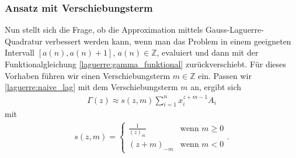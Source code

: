 \subsubsection{Ansatz mit Verschiebungsterm}
Nun stellt sich die Frage,
ob die Approximation mittels Gauss-Laguerre-Quadratur verbessert werden kann,
wenn man das Problem in einem geeigneten Intervall $[a(n), a(n)+1]$,
$a(n) \in \mathbb{Z}$,
evaluiert und dann mit der
Funktionalgleichung \eqref{laguerre:gamma_funktional} zurückverschiebt.
Für dieses Vorhaben führen wir einen Verschiebungsterm $m \in \mathbb{Z}$ ein.
Passen wir \eqref{laguerre:naive_lag}
mit dem Verschiebungsterm $m$
an,
ergibt sich
\begin{align}
\Gamma(z)
\approx
s(z, m) \sum_{i=1}^n x_i^{z + m - 1} A_i
\label{laguerre:shifted_lag}
\end{align}
mit
\begin{align*}
s(z, m)
=
\begin{cases}
\displaystyle
\frac{1}{(z)_m} & \text{wenn } m \geq 0 \\
(z + m)_{-m}    & \text{wenn } m < 0
\end{cases}
.
\end{align*}

